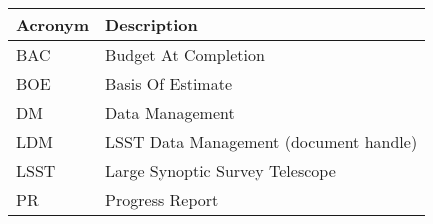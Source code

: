 \addtocounter{table}{-1}
\begin{longtable}{|l|p{}|}\hline
\textbf{Acronym} & \textbf{Description}  \\\hline

BAC & Budget At Completion \\\hline
BOE & Basis Of Estimate \\\hline
DM & Data Management \\\hline
LDM & LSST Data Management (document handle) \\\hline
LSST & Large Synoptic Survey Telescope \\\hline
PR & Progress Report \\\hline
\end{longtable}
